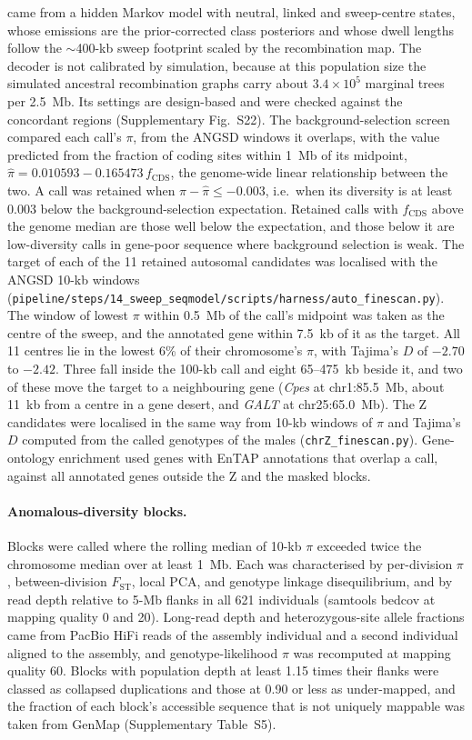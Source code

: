 \documentclass[11pt]{article}
\newcommand{\Fst}{F_\mathrm{ST}}
\begin{document}
came from a hidden Markov model with neutral, linked and sweep-centre states, whose emissions are the
prior-corrected class posteriors and whose dwell lengths follow the $\sim$400-kb sweep footprint scaled by the
recombination map. The decoder is not calibrated by simulation, because at this population size the simulated ancestral recombination graphs carry about $3.4\times10^{5}$ marginal trees per 2.5~Mb. Its settings are design-based and were checked against the concordant regions (Supplementary Fig.~S22). The background-selection screen compared each call's $\pi$, from the ANGSD windows it overlaps, with the value predicted from the fraction of coding sites within 1~Mb of its midpoint, $\hat\pi=0.010593-0.165473\,f_\mathrm{CDS}$, the genome-wide linear relationship between the two. A call was retained when $\pi-\hat\pi\leq-0.003$, i.e.\ when its diversity is at least 0.003 below the background-selection expectation. Retained calls with $f_\mathrm{CDS}$ above the genome median are those well below the expectation, and those below it are low-diversity calls in gene-poor sequence where background selection is weak.
The target of each of the 11 retained autosomal candidates was localised with the ANGSD 10-kb windows (\texttt{pipeline/steps/14\_sweep\_seqmodel/scripts/harness/auto\_finescan.py}). The window of lowest $\pi$ within 0.5~Mb of the call's midpoint was taken as the centre of the sweep, and the annotated gene within 7.5~kb of it as the target. All 11 centres lie in the lowest 6\% of their chromosome's $\pi$, with Tajima's $D$ of $-2.70$ to $-2.42$. Three fall inside the 100-kb call and eight 65--475~kb beside it, and two of these move the target to a neighbouring gene (\textit{Cpes} at chr1:85.5~Mb, about 11~kb from a centre in a gene desert, and \textit{GALT} at chr25:65.0~Mb). The Z candidates were localised in the same way from 10-kb windows of $\pi$ and Tajima's $D$ computed from the called genotypes of the males (\texttt{chrZ\_finescan.py}).
Gene-ontology enrichment used genes with EnTAP \citep{hart2020entap} annotations that overlap a call, against all
annotated genes outside the Z and the masked blocks.

\paragraph{Anomalous-diversity blocks.}
Blocks were called where the rolling median of 10-kb $\pi$ exceeded twice the chromosome median over at least
1~Mb. Each was characterised by per-division $\pi$, between-division $\Fst$, local PCA, and genotype linkage
disequilibrium, and by read depth relative to 5-Mb flanks in all 621 individuals (samtools bedcov at mapping
quality 0 and 20). Long-read depth and heterozygous-site allele fractions came from PacBio HiFi reads of the
assembly individual and a second individual aligned to the assembly, and genotype-likelihood $\pi$ was
recomputed at mapping quality 60. Blocks with population depth at least 1.15 times their flanks were classed as
collapsed duplications and those at 0.90 or less as under-mapped, and the fraction of each block's accessible sequence that is not uniquely mappable was taken from GenMap (Supplementary Table~S5).
\end{document}
